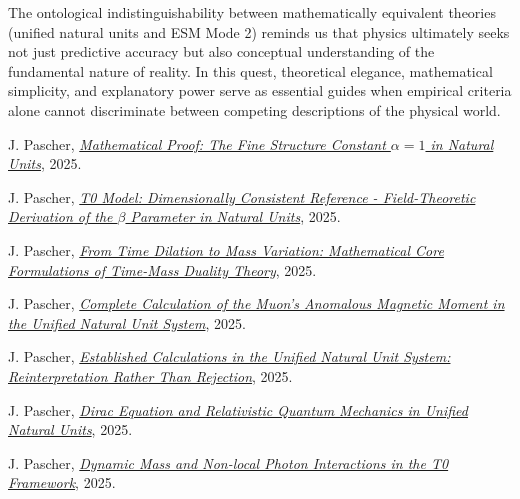 \documentclass[12pt,a4paper]{article}
\begin{document}
	The ontological indistinguishability between mathematically equivalent theories (unified natural units and ESM Mode 2) reminds us that physics ultimately seeks not just predictive accuracy but also conceptual understanding of the fundamental nature of reality. In this quest, theoretical elegance, mathematical simplicity, and explanatory power serve as essential guides when empirical criteria alone cannot discriminate between competing descriptions of the physical world.
	
	\begin{thebibliography}{99}
		J. Pascher, \href{https://github.com/jpascher/T0-Time-Mass-Duality/blob/main/2/pdf/ResolvingTheConstantsAlfaEn.pdf}{\textit{Mathematical Proof: The Fine Structure Constant $\alpha = 1$ in Natural Units}}, 2025.
		
		J. Pascher, \href{https://github.com/jpascher/T0-Time-Mass-Duality/blob/main/2/pdf/DerivationVonBetaEn.pdf}{\textit{T0 Model: Dimensionally Consistent Reference - Field-Theoretic Derivation of the $\beta$ Parameter in Natural Units}}, 2025.
		
		J. Pascher, \href{https://github.com/jpascher/T0-Time-Mass-Duality/blob/main/2/pdf/MathZeitMasseLagrangeEn.pdf}{\textit{From Time Dilation to Mass Variation: Mathematical Core Formulations of Time-Mass Duality Theory}}, 2025.
		
		J. Pascher, \href{https://github.com/jpascher/T0-Time-Mass-Duality/blob/main/2/pdf/CompleteMuon_g-2_AnalysisEn.pdf}{\textit{Complete Calculation of the Muon's Anomalous Magnetic Moment in the Unified Natural Unit System}}, 2025.
		
		J. Pascher, \href{https://github.com/jpascher/T0-Time-Mass-Duality/blob/main/2/pdf/PragmaticApproachT0-ModelEn.pdf}{\textit{Established Calculations in the Unified Natural Unit System: Reinterpretation Rather Than Rejection}}, 2025.
		
		
		J. Pascher, \href{https://github.com/jpascher/T0-Time-Mass-Duality/blob/main/2/pdf/diracEn.pdf}{\textit{Dirac Equation and Relativistic Quantum Mechanics in Unified Natural Units}}, 2025.
		
		J. Pascher, \href{https://github.com/jpascher/T0-Time-Mass-Duality/blob/main/2/pdf/DynMassePhotonenNichtlokalEn.pdf}{\textit{Dynamic Mass and Non-local Photon Interactions in the T0 Framework}}, 2025.
		

\end{thebibliography}
\end{document}
